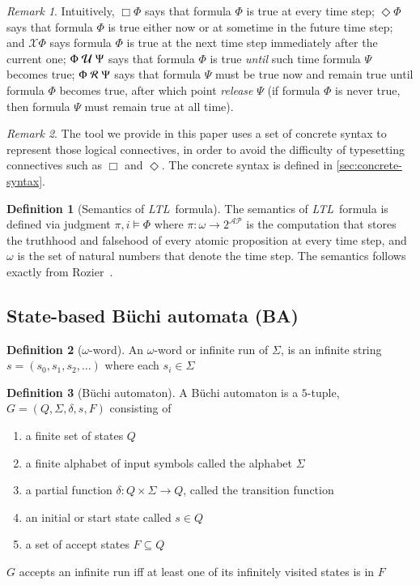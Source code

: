 \documentclass[preprint,12pt]{elsarticle}
\theoremstyle{definition}
\newtheorem{definition}{Definition}[section]
\theoremstyle{remark}
\newtheorem{remark}{Remark}[section]
\newcommand{\AP}{\mathcal{AP}}
\newcommand{\always}{\Box}
\newcommand{\eventually}{\Diamond}
\newcommand{\nextt}{\mathcal{X}}
\newcommand{\ltl}{\textit{LTL}}
\newcommand{\Buchi}{B\"{u}chi }
\newcommand{\stronguntil}{\hspace{0.1cm} \mathcal{U}  \hspace{0.1cm}}
\newcommand{\weakrelease}{\hspace{0.1cm} \mathcal{R} \hspace{0.1cm}}
\begin{document}
\begin{remark}
    Intuitively, $\always \Phi$ says that formula $\Phi$ is true at every time step; $\eventually \Phi$ says that formula $\Phi$ is true either now or at sometime in the future time step; and $\nextt \Phi$ says formula $\Phi$ is true at the next time step immediately after the current one; $\Phi \stronguntil \Psi$ says that formula $\Phi$ is true \textit{until} such time formula $\Psi$ becomes true; $\Phi \weakrelease \Psi$ says that formula $\Psi$ must be true now and remain true until formula $\Phi$ becomes true, after which point \textit{release} $\Psi$ (if formula $\Phi$ is never true, then formula $\Psi$ must remain true at all time).
\end{remark}

\begin{remark}
    The tool we provide in this paper uses a set of concrete syntax to represent those logical connectives, in order to avoid the difficulty of typesetting connectives such as $\always$ and $\eventually$. The concrete syntax is defined in \ref{sec:concrete-syntax}.
\end{remark}

\begin{definition}[Semantics of \ltl\ formula]
    The semantics of \ltl\ formula is defined via judgment $\pi, i \models \Phi$ where $\pi : \omega \rightarrow 2^{\AP}$ is the computation that stores the truthhood and falsehood of every atomic proposition at every time step, and $\omega$ is the set of natural numbers that denote the time step. The semantics follows exactly from Rozier~\cite{Roz11}.
\end{definition}

\subsection{State-based \Buchi automata (BA)}
\begin{definition}[$\omega$-word]
    An $\omega$-word or infinite run of $\Sigma$, is an infinite string $s = (s_0, s_1, s_2, \dots)$ where each $s_i\in \Sigma$
\end{definition}
\begin{definition}[\Buchi automaton]
    A \Buchi automaton is a $5$-tuple, $G = (Q, \Sigma, \delta, s, F)$ consisting of
    \begin{enumerate}
        \item a finite set of states $Q$
        \item a finite alphabet of input symbols called the alphabet $\Sigma$
        \item a partial function $\delta : Q\times \Sigma \to Q$, called the transition function
        \item an initial or start state called $s\in Q$
        \item a set of accept states $F \subseteq Q$
    \end{enumerate}
    $G$ accepts an infinite run iff at least one of its infinitely visited states is in $F$
\end{definition}
\end{document}
